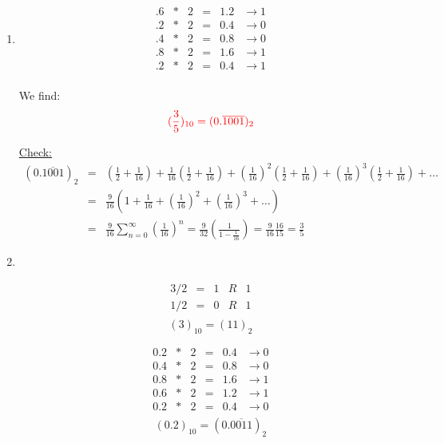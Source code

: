 \documentclass[pdftex,11pt]{article}
\begin{document}
\begin{enumerate}
\item
$$
\begin{array}{rcrccc}
.6& *& 2   & = & 1.2&    \rightarrow     1  \\
.2& *& 2   & = & 0.4&    \rightarrow     0  \\
.4& *& 2   & = & 0.8&    \rightarrow     0  \\
.8& *& 2   & = & 1.6&    \rightarrow     1  \\
\hline
.2& *& 2   & = & 0.4&    \rightarrow     1  \\
\end{array}
$$


We find:
$$\color{red} (\frac{3}{5})_{10} = (0.\overline{1001})_2 $$


\underline{Check:}
\begin{eqnarray}
(0.\overline{1001})_{2} 
\nonumber & = & \left(\frac{1}{2}+ \frac{1}{16}\right)+ \frac{1}{16}\left(\frac{1}{2}+ \frac{1}{16}\right)
+ \left(\frac{1}{16}\right)^2\left(\frac{1}{2}+ \frac{1}{16}\right)
+ \left(\frac{1}{16}\right)^3\left(\frac{1}{2}+ \frac{1}{16}\right)
+ \ldots\\
\nonumber & = & \frac{9}{16}\left(1 + \frac{1}{16}+ \left(\frac{1}{16}\right)^2+ \left(\frac{1}{16}\right)^3+\ldots \right)\\
\nonumber & = & \frac{9}{16}\sum_{n=0}^\infty\left(\frac{1}{16}\right)^n
 = \frac{9}{32}\left(\frac{1}{1-\frac{1}{16}}\right)
 = \frac{9}{16}\frac{16}{15}
 = \frac{3}{5}
\end{eqnarray}

\item 
~\\

\begin{minipage}{.4\textwidth}
$$
\begin{array}{rcrcc}
3/2  & = &    1 & R & 1 \\
1/2  & = &    0 & R & 1 \\
\end{array}
$$
$$(3)_{10} = (11)_2$$
\end{minipage}
\begin{minipage}{.4\textwidth}
$$
\begin{array}{rcrccc}
0.2& *& 2   & = & 0.4 &    \rightarrow     0  \\
0.4& *& 2   & = & 0.8 &    \rightarrow     0  \\
0.8& *& 2   & = & 1.6 &    \rightarrow     1  \\
0.6& *& 2   & = & 1.2 &    \rightarrow     1  \\
\hline
0.2& *& 2   & = & 0.4 &    \rightarrow     0  \\
\end{array}
$$
$$ (0.2)_{10} = (0.\overline{0011})_2$$
\end{minipage}


\end{enumerate}
\end{document}
